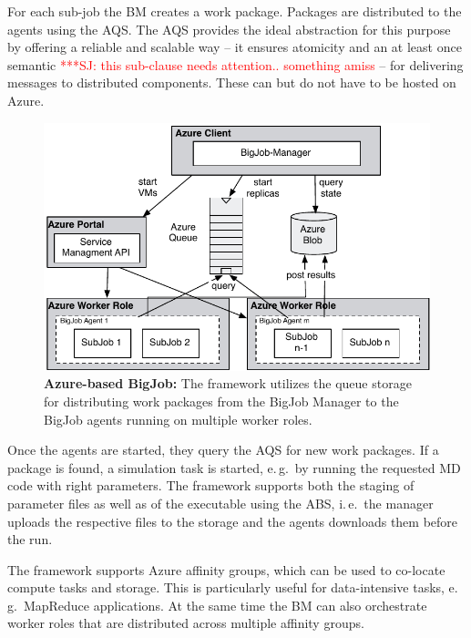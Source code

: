 \documentclass[conference,final]{IEEEtran}
\newcommand{\up}{\vspace*{-1em}}
\newcommand{\jhanote}[1]{ {\textcolor{red} { ***SJ: #1 }}}
\newcommand{\jhanote}[1]{}
\begin{document}
For each sub-job the BM creates a work package. Packages are
distributed to the agents using the AQS. The AQS provides the ideal
abstraction for this purpose by offering a reliable and scalable way
-- it ensures atomicity and an at least once semantic \jhanote{this
  sub-clause needs attention.. something amiss} -- for delivering
messages to distributed components. These can but do not have to be
hosted on Azure.


\begin{figure}
    \centering
    \includegraphics[width=.4\textwidth]{figures/bigjob_azure}
    \caption{\textbf{Azure-based BigJob:} The framework
      utilizes the queue storage for distributing work
      packages from the BigJob Manager to the
      BigJob agents running on multiple worker roles.}
    \label{fig:figures_bigjob_azure}
    \up\up
\end{figure}

Once the agents are started, they query the AQS for new work
packages.  If a package is found, a simulation task is started, e.\,g.\
by running the requested MD code with right parameters. The framework
supports both the staging of parameter files as well as of the
executable using the ABS, i.\,e.\ the manager
uploads the respective files to the storage and the agents downloads
them before the run.

The framework supports Azure affinity groups, which
can be used to co-locate compute tasks and storage. This is
particularly useful for data-intensive tasks, e.\,g.\ MapReduce
applications. At the same time the BM can also orchestrate worker roles that
are distributed across multiple affinity groups.


\end{document}
